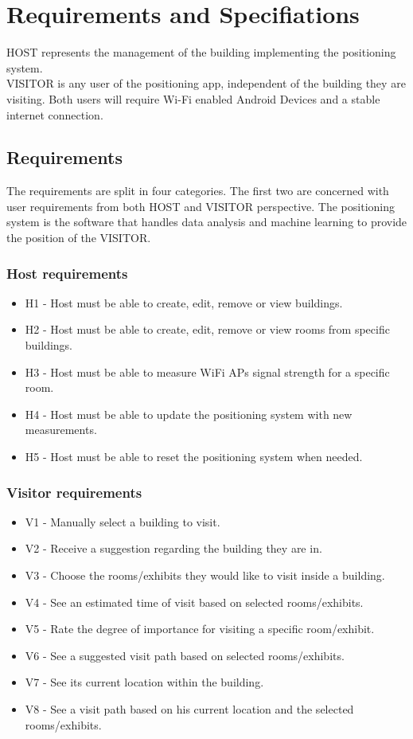 \chapter{Requirements and Specifiations}
HOST represents the management of the building implementing the positioning system.\\ 
VISITOR is any user of the positioning app, independent of the building they are visiting.
Both users will require Wi-Fi enabled Android Devices and a stable internet connection. 

\section{Requirements}
The requirements are split in four categories. The first two are concerned with user requirements from both HOST and VISITOR perspective. The positioning system is the software that handles data analysis and machine learning to provide the position of the VISITOR.

\subsection{Host requirements}
	\begin{itemize}
		\item H1 - Host must be able to create, edit, remove or view buildings.
		\item H2 - Host must be able to create, edit, remove or view rooms from specific buildings.
		\item H3 - Host must be able to measure WiFi APs signal strength for a specific room.
		\item H4 - Host must be able to update the positioning system with new measurements.
		\item H5 - Host must be able to reset the positioning system when needed.
	\end{itemize}

\subsection{Visitor requirements}
	\begin{itemize}
		\item V1 - Manually select a building to visit.
		\item V2 - Receive a suggestion regarding the building they are in.
		\item V3 - Choose the rooms/exhibits they would like to visit inside a building.
		\item V4 - See an estimated time of visit based on selected rooms/exhibits.
		\item V5 - Rate the degree of importance for visiting a specific room/exhibit.
		\item V6 - See a suggested visit path based on selected rooms/exhibits.
		\item V7 - See its current location within the building.
		\item V8 - See a visit path based on his current location and the selected rooms/exhibits.
	\end{itemize}

